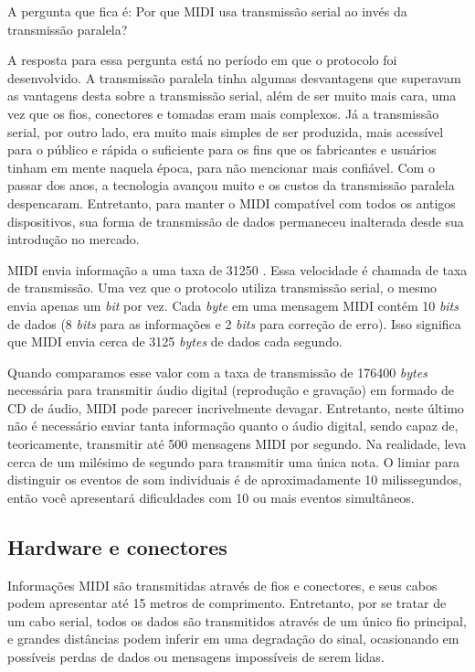             A pergunta que fica é: Por que MIDI usa transmissão serial ao invés da transmissão paralela?

            A resposta para essa pergunta está no período em que o protocolo foi desenvolvido. A transmissão paralela tinha algumas desvantagens que superavam as vantagens desta sobre a transmissão serial, além de ser muito mais cara, uma vez que os fios, conectores e tomadas eram mais complexos. Já a transmissão serial, por outro lado, era muito mais simples de ser produzida, mais acessível para o público e rápida o suficiente para os fins que os fabricantes e usuários tinham em mente naquela época, para não mencionar mais confiável. Com o passar dos anos, a tecnologia avançou muito e os custos da transmissão paralela despencaram. Entretanto, para manter o MIDI compatível com todos os antigos dispositivos, sua forma de transmissão de dados permaneceu inalterada desde sua introdução no mercado.

            MIDI envia informação a uma taxa de 31250 . Essa velocidade é chamada de taxa de transmissão. Uma vez que o protocolo utiliza transmissão serial, o mesmo envia apenas um \textit{bit} por vez. Cada \textit{byte} em uma mensagem MIDI contém 10 \textit{bits} de dados (8 \textit{bits} para as informações e 2 \textit{bits} para correção de erro). Isso significa que MIDI envia cerca de 3125 \textit{bytes} de dados cada segundo.

            Quando comparamos esse valor com a taxa de transmissão de 176400 \textit{bytes} necessária para transmitir áudio digital (reprodução e gravação) em formado de CD de áudio, MIDI pode parecer incrivelmente devagar. Entretanto, neste último não é necessário enviar tanta informação quanto o áudio digital, sendo capaz de, teoricamente, transmitir até 500 mensagens MIDI por segundo. Na realidade, leva cerca de um milésimo de segundo para transmitir uma única nota. O limiar para distinguir os eventos de som individuais é de aproximadamente 10 milissegundos, então você apresentará dificuldades com 10 ou mais eventos simultâneos.

        \subsection{Hardware e conectores}

            Informações MIDI são transmitidas através de fios e conectores, e seus cabos podem apresentar até 15 metros de comprimento. Entretanto, por se tratar de um cabo serial, todos os dados são transmitidos através de um único fio principal, e grandes distâncias podem inferir em uma degradação do sinal, ocasionando em possíveis perdas de dados ou mensagens impossíveis de serem lidas.

